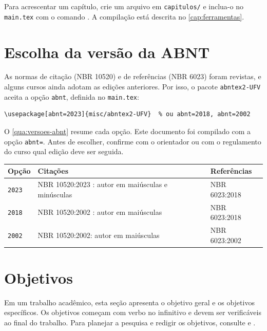 \documentclass[
	12pt, %
	openright, %
	oneside, %
	a4paper, %
	sumario=tradicional, %
	english, %
	brazil, %
]{abntex2}
\begin{document}
Para acrescentar um capítulo, crie um arquivo em \texttt{capitulos/} e inclua-o no \texttt{main.tex} com o comando \verb||. A compilação está descrita no \autoref{cap:ferramentas}.

\section{Escolha da versão da ABNT}\label{sec:versao-abnt}

As normas de citação (NBR 10520) e de referências (NBR 6023) foram revistas, e alguns cursos ainda adotam as edições anteriores. Por isso, o pacote \texttt{abntex2-UFV} aceita a opção \texttt{abnt}, definida no \texttt{main.tex}:

\begin{verbatim}
\usepackage[abnt=2023]{misc/abntex2-UFV}  % ou abnt=2018, abnt=2002
\end{verbatim}

O \autoref{qua:versoes-abnt} resume cada opção. Este documento foi compilado com a opção \texttt{abnt=\imprimirversaoabnt}. Antes de escolher, confirme com o orientador ou com o regulamento do curso qual edição deve ser seguida.

\begin{quadro}[htbp]
	\caption{Versões da ABNT disponíveis no modelo}\label{qua:versoes-abnt}
	\centering
	\begin{tabular}{p{}p{}p{}}
		\toprule
		\textbf{Opção} & \textbf{Citações} & \textbf{Referências} \\
		\midrule
		\texttt{2023} & NBR 10520:2023 \cite{abnt10520}: autor em maiúsculas e minúsculas & NBR 6023:2018 \cite{abnt6023} \\
		\texttt{2018} & NBR 10520:2002 \cite{abnt10520-2002}: autor em maiúsculas & NBR 6023:2018 \\
		\texttt{2002} & NBR 10520:2002: autor em maiúsculas & NBR 6023:2002 \cite{abnt6023-2002} \\
		\bottomrule
	\end{tabular}
\end{quadro}

\section{Objetivos}\label{sec:objetivos}

Em um trabalho acadêmico, esta seção apresenta o objetivo geral e os objetivos específicos. Os objetivos começam com verbo no infinitivo e devem ser verificáveis ao final do trabalho. Para planejar a pesquisa e redigir os objetivos, consulte  e .
\end{document}
